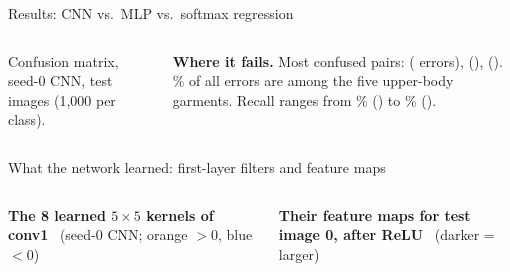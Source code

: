 \documentclass[aspectratio=169,10pt]{beamer}
\begin{document}
\begin{frame}{Results: CNN vs.\ MLP vs.\ softmax regression}
\begin{columns}[T,onlytextwidth]
\vspace{0.3mm}
{\scriptsize\color{cTok}Confusion matrix, seed-0 CNN, \nTest{} test images (1{,}000 per class).}

\vspace{0.8mm}
\raggedright\footnotesize
\textbf{Where it fails.} Most confused pairs: \confOne{} (\confOneN{} errors), \confTwo{} (\confTwoN),
\confThree{} (\confThreeN). \upperShare\% of all errors are among the five upper-body garments.
Recall ranges from \worstRecall\% (\worstClass) to \bestRecall\% (\bestClass).
\end{columns}
\end{frame}

\begin{frame}{What the network learned: first-layer filters and feature maps}
\begin{columns}[T,onlytextwidth]
\centering
{\footnotesize\textbf{The 8 learned $5\times5$ kernels of conv1} \ (seed-0 CNN; {\color{cAtt}orange} $>0$, {\color{cEmb}blue} $<0$)}

\vspace{0.8mm}
\begin{tikzpicture}[x=1.95mm,y=1.95mm,lab/.append style={font=\fontsize{5.5}{6}\selectfont,text=cTok}]
  
\end{tikzpicture}

\vspace{1.5mm}
{\footnotesize\textbf{Their feature maps for test image 0, after ReLU} \ (darker = larger)}

\vspace{0.8mm}
\begin{tikzpicture}[x=0.68mm,y=0.68mm,lab/.append style={font=\fontsize{5.5}{6}\selectfont,text=cTok}]
  
\end{tikzpicture}
\centering
{}


\end{columns}
\end{frame}
\end{document}
